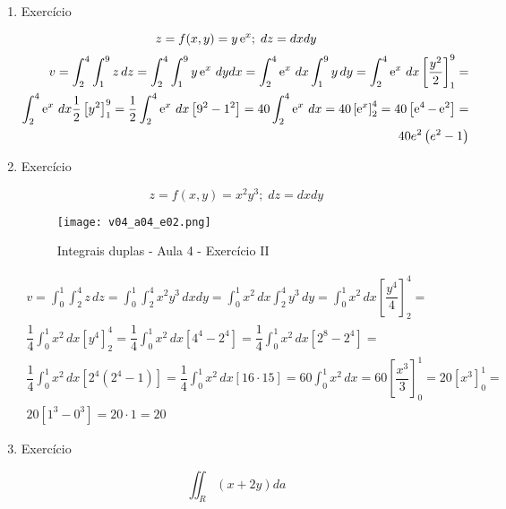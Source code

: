 \begin{enumerate}
	\item Exercício
	
	\begin{equation*}
		z = f(x, y) = y\operatorname{e}^x;\; dz = dx dy	
	\end{equation*}
	\begin{align*}
		v = \int_2^4 \int_1^9 z\, dz = \int_2^4 \int_1^9 y\operatorname{e}^x\, dy dx = \int_2^4 \operatorname{e}^x\, dx \int_1^9 y\, dy = \int_2^4 \operatorname{e}^x\, dx \left[\dfrac{y^2}{2}\right]_1^9 =\\ \int_2^4 \operatorname{e}^x\, dx \dfrac{1}{2}\left[y^2\right]_1^9 = \dfrac{1}{2}\int_2^4 \operatorname{e}^x\, dx \left[9^2 - 1^2\right] = 40\int_2^4 \operatorname{e}^x\, dx = 40\left[\operatorname{e}^x\right]_2^4 = 40\left[\operatorname{e}^4 - \operatorname{e}^2\right] =\\ 40e^2\left(e^2 - 1\right)	
	\end{align*}
	
	\item Exercício
	
	\begin{equation*}
		z = f(x,y) = x^2y^3;\; dz = dx dy
	\end{equation*}
	
	\begin{figure}[htb]
		\caption{Integrais duplas - Aula 4 - Exercício II}
		\label{v04_a04_e02}
		\centering
		\texttt{[image: v04\_a04\_e02.png]}		
	\end{figure}
	
	\begin{align*}
		v = \int_0^1 \int_2^4 z\, dz = \int_0^1 \int_2^4 x^2y^3\, dx dy = \int_0^1 x^2\, dx \int_2^4 y^3\, dy = \int_0^1 x^2\, dx \left[\dfrac{y^4}{4}\right]_2^4 =\\ \dfrac{1}{4}\int_0^1 x^2\, dx \left[y^4\right]_2^4 = \dfrac{1}{4}\int_0^1 x^2\, dx \left[4^4 - 2^4\right] = \dfrac{1}{4}\int_0^1 x^2\, dx \left[2^8 - 2^4\right] =\\ \dfrac{1}{4}\int_0^1 x^2\, dx \left[2^4\left(2^4 - 1\right)\right] = \dfrac{1}{4}\int_0^1 x^2\, dx \left[16 \cdot 15\right] = 60\int_0^1 x^2\, dx = 60 \left[\dfrac{x^3}{3}\right]_0^1 = 20 \left[x^3\right]_0^1 =\\ 20 \left[1^3 - 0^3\right] = 20 \cdot 1 =  20
	\end{align*}
	
	\item Exercício
	
	\begin{equation*}
		\iint_R (x + 2y) da
	\end{equation*}
	

\end{enumerate}
